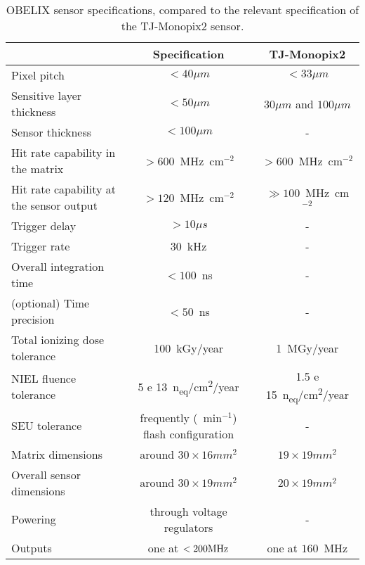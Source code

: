 \begin{sidewaystable}
\centering
\begin{tabular}{lc|c}
\hline
\hline
 & Specification & TJ-Monopix2\\
\hline
Pixel pitch & $< 40 \mu m$ & $< 33 \mu m$ \\
Sensitive layer thickness & $< 50 \mu m$ & $30 \mu m$ and $ 100\mu m$ \\
Sensor thickness & $< 100\mu m$ & - \\
\hline
Hit rate capability in the matrix & $> 600$~MHz~cm$^{-2}$ & $> 600$~MHz~cm$^{-2}$ \\
Hit rate capability at the sensor output & $>120$~MHz~cm$^{-2}$ & $\gg 100$~MHz~cm$^{-2}$ \\
Trigger delay & $>10 \mu s$ & - \\
Trigger rate & $30$~kHz & - \\
Overall integration time & $<100$~ns & - \\
(optional) Time precision & $<50$~ns & - \\
\hline
Total ionizing dose tolerance & 100~kGy/year & 1~MGy/year \\
NIEL fluence tolerance & \SI{5 e 13}{n_{eq}/cm^2/year}  & \SI{1.5 e 15}{n_{eq}/cm^2/year} \\
SEU tolerance & frequently (~min$^{-1}$) flash configuration & - \\
\hline
Matrix dimensions & around $30 \times 16 mm^{2}$ & $19 \times 19 mm^{2}$ \\
Overall sensor dimensions & around $30 \times 19 mm^{2}$ & $20 \times 19 mm^{2}$\\
Powering & through voltage regulators & - \\
Outputs & one at $<200 \rm{ MHz}$ & one at $160$~MHz \\
\hline
\hline
\end{tabular}
\caption{OBELIX sensor specifications, compared to the relevant specification of the TJ-Monopix2 sensor.}
\label{tab:obelix_specification}
\end{sidewaystable}

\begin{comment}
\begin{table}[h!]
\centering
\texttt{[image: obelix\_specification]}
\caption{Comparison between BELLE II requirements and TJ-Monopix2 features.}
\label{tab:obelix_specification}
\end{table}
\end{comment}

